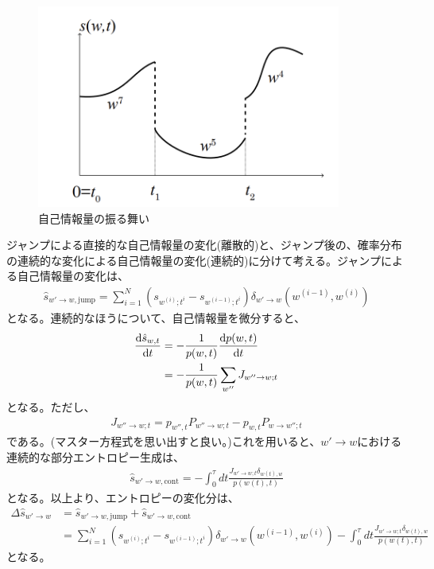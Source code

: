 \documentclass[a4paper,11pt]{jsarticle}
\numberwithin{equation}{section}
\begin{document}
\begin{figure}[H]
    \begin{center}
    \includegraphics[width=100mm]{stoen.png}
    \end{center}
    \caption{自己情報量の振る舞い}
    \label{fig:one}
\end{figure}

ジャンプによる直接的な自己情報量の変化(離散的)と、ジャンプ後の、確率分布の連続的な変化による自己情報量の変化(連続的)に分けて考える。ジャンプによる自己情報量の変化は、
\begin{align}
    \hat{s}_{w' \to w,\text{jump}} = \sum_{i=1}^{N} (s_{w^{(i)};t^i} - s_{w^{(i-1)};t^i})\delta_{w'\to w}(w^{(i-1)}, w^{(i)})
\end{align}
となる。連続的なほうについて、自己情報量を微分すると、
\begin{align}
    \dv{\hat{s}_{w,t}}{t} &= -\frac{1}{p(w,t)}\dv{p(w,t)}{t}\\
    &= -\frac{1}{p(w,t)}\sum_{w''} J_{w'' \to w; t}\\
\end{align}
となる。ただし、
\begin{align}
    J_{w'' \to w; t} = p_{w'' ,t} P_{w'' \to w; t}- p_{w,t} P_{w \to w''; t}
\end{align}
である。(マスター方程式を思い出すと良い。)これを用いると、$w' \to w$における連続的な部分エントロピー生成は、
\begin{align}
    \hat{s}_{w' \to w, \text{cont}} = -\int_{0}^{\tau} dt \frac{J_{w' \to w; t}\delta_{w(t), w}}{p(w(t), t)}
\end{align}
となる。以上より、エントロピーの変化分は、
\begin{align}
    \Delta \hat{s}_{w' \to w} &= \hat{s}_{w' \to w, \text{jump}} + \hat{s}_{w' \to w, \text{cont}}\\
    &= \sum_{i=1}^{N} (s_{w^{(i)};t^i} - s_{w^{(i-1)};t^i})\delta_{w'\to w}(w^{(i-1)}, w^{(i)}) -\int_{0}^{\tau} dt \frac{J_{w' \to w; t}\delta_{w(t), w}}{p(w(t), t)}
\end{align}
となる。\\
\end{document}
